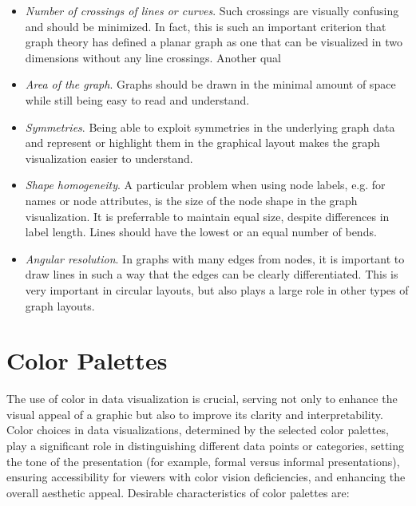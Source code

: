 \begin{itemize}
  \item \emph{Number of crossings of lines or curves}. Such crossings are visually confusing and should be minimized. In fact, this is such an important criterion that graph theory has defined a planar graph as one that can be visualized in two dimensions without any line crossings. Another qual
  \item \emph{Area of the graph}. Graphs should be drawn in the minimal amount of space while still being easy to read and understand.
  \item \emph{Symmetries}. Being able to exploit symmetries in the underlying graph data and represent or highlight them in the graphical layout makes the graph visualization easier to understand. 
  \item \emph{Shape homogeneity}. A particular problem when using node labels, e.g. for names or node attributes, is the size of the node shape in the graph visualization. It is preferrable to maintain equal size, despite differences in label length. Lines should have the lowest or an equal number of bends.
  \item \emph{Angular resolution}. In graphs with many edges from nodes, it is important to draw lines in such a way that the edges can be clearly differentiated. This is very important in circular layouts, but also plays a large role in other types of graph layouts.
\end{itemize}
  

\section{Color Palettes}

The use of color in data visualization is crucial, serving not only to enhance the visual appeal of a graphic but also to improve its clarity and interpretability. Color choices in data visualizations, determined by the selected color palettes, play a significant role in distinguishing different data points or categories, setting the tone of the presentation (for example, formal versus informal presentations), ensuring accessibility for viewers with color vision deficiencies, and enhancing the overall aesthetic appeal. Desirable characteristics of color palettes are:

